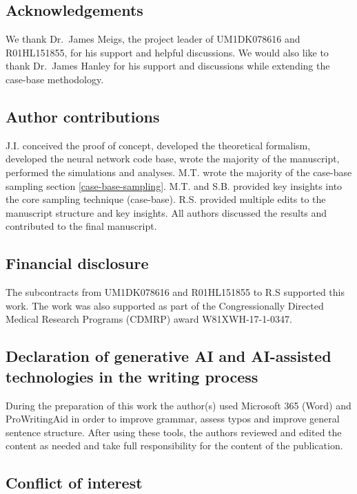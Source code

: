 \documentclass[preprint,12pt,authoryear]{elsarticle}
\begin{document}
\hypertarget{acknowledgements}{%
\subsection*{Acknowledgements}\label{acknowledgements}}

We thank Dr.~James Meigs, the project leader of UM1DK078616 and R01HL151855, for his support and helpful discussions. We would also like to thank Dr.~James Hanley for his support and discussions while extending the case-base methodology.

\subsection*{Author contributions}

J.I. conceived the proof of concept, developed the theoretical formalism, developed the neural network code base, wrote the majority of the manuscript, performed the simulations and analyses. M.T. wrote the majority of the case-base sampling section \ref{case-base-sampling}. M.T. and S.B. provided key insights into the core sampling technique (case-base). R.S. provided multiple edits to the manuscript structure and key insights. All authors discussed the results and contributed to the final manuscript.

\subsection*{Financial disclosure}

The subcontracts from UM1DK078616 and R01HL151855 to R.S supported this work. The work was also supported as part of the Congressionally Directed Medical Research Programs (CDMRP) award W81XWH-17-1-0347.

\subsection*{Declaration of generative AI and AI-assisted technologies in the writing process} During the preparation of this work the author(s) used Microsoft 365 (Word) and ProWritingAid in order to improve grammar, assess typos and improve general sentence structure. After using these tools, the authors reviewed and edited the content as needed and take full responsibility for the content of the publication.


\subsection*{Conflict of interest}
\end{document}
